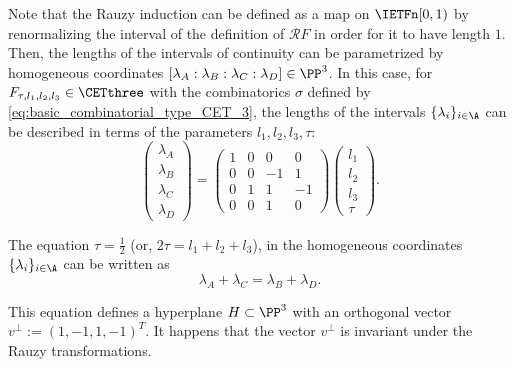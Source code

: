 \documentclass[12pt]{article}
\theoremstyle{definition}
\begin{document}

\bigskip

Note that the Rauzy induction can be defined as a map on $\IETFn[0,1)$ by renormalizing the interval of the definition of $\mathcal{R}F$ in order for it to have length $1$. Then, the lengths of the intervals of continuity can be parametrized by homogeneous coordinates
$[\lambda_A:\lambda_B:\lambda_C:\lambda_D] \in \PP^3$. In this case, for $F_{\tau, l_1, l_2, l_3} \in \CETthree$ with the combinatorics $\sigma$ defined by \ref{eq:basic_combinatorial_type_CET_3}, the lengths of the intervals $\{\lambda_i\}_{i \in \A}$ can be described in terms of the parameters $l_1, l_2, l_3, \tau$:
\begin{equation*}
\begin{pmatrix} 
\lambda_A\\
\lambda_B\\
\lambda_C\\
\lambda_D
\end{pmatrix}=
\begin{pmatrix}
1&0&0&0\\
0&0&-1&1\\
0&1&1&-1\\
0&0&1&0
\end{pmatrix}
\begin{pmatrix}
l_1\\
l_2\\
l_3\\
\tau
\end{pmatrix}.
\end{equation*}

The equation $\tau=\frac{1}{2}$ (or, $2\tau=l_1+l_2+l_3$), in the homogeneous coordinates $\{\lambda_i\}_{i \in \A}$ can be written as 
\begin{equation*}
\lambda_A+\lambda_C=\lambda_B+\lambda_D.
\end{equation*}

This equation defines a hyperplane $H \subset \PP^3$ with an orthogonal vector $v^{\perp}:=(1,-1,1,-1)^T$. It happens that the vector $v^{\perp}$ is invariant under the Rauzy transformations. 
\end{document}
